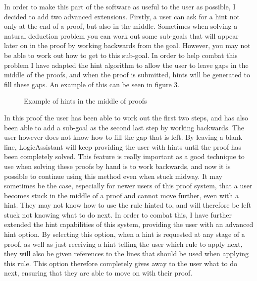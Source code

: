 In order to make this part of the software as useful to the user as possible, I decided to add two advanced extensions. Firstly, a user can ask for a hint not only at the end of a proof, but also in the middle. Sometimes when solving a natural deduction problem you can work out some sub-goals that will appear later on in the proof by working backwards from the goal. However, you may not be able to work out how to get to this sub-goal. In order to help combat this problem I have adapted the hint algorithm to allow the user to leave gaps in the middle of the proofs, and when the proof is submitted, hints will be generated to fill these gaps. An example of this can be seen in figure 3.

\begin{figure}[!ht]
	\centering
	\caption{Example of hints in the middle of proofs}
\end{figure}

In this proof the user has been able to work out the first two steps, and has also been able to add a sub-goal as the second last step by working backwards. The user however does not know how to fill the gap that is left. By leaving a blank line, LogicAssistant will keep providing the user with hints until the proof has been completely solved. This feature is really important as a good technique to use when solving these proofs by hand is to work backwards, and now it is possible to continue using this method even when stuck midway. It may sometimes be the case, especially for newer users of this proof system, that a user becomes stuck in the middle of a proof and cannot move further, even with a hint. They may not know how to use the rule hinted to, and will therefore be left stuck not knowing what to do next. In order to combat this, I have further extended the hint capabilities of this system, providing the user with an advanced hint option. By selecting this option, when a hint is requested at any stage of a proof, as well as just receiving a hint telling the user which rule to apply next, they will also be given references to the lines that should be used when applying this rule. This option therefore completely gives away to the user what to do next, ensuring that they are able to move on with their proof.

